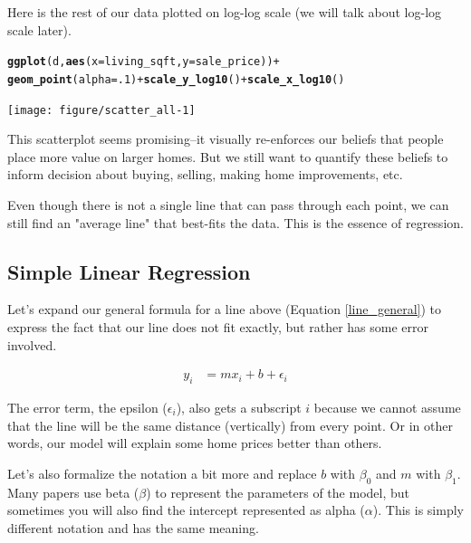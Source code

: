 \documentclass[10pt]{article}\usepackage[]{graphicx}\usepackage[]{color}
\makeatletter
\newcommand{\hlnum}[1]{\textcolor[rgb]{0.686,0.059,0.569}{#1}}%
\newcommand{\hlopt}[1]{\textcolor[rgb]{0,0,0}{#1}}%
\newcommand{\hlstd}[1]{\textcolor[rgb]{0.345,0.345,0.345}{#1}}%
\newcommand{\hlkwc}[1]{\textcolor[rgb]{0.333,0.667,0.333}{#1}}%
\newcommand{\hlkwd}[1]{\textcolor[rgb]{0.737,0.353,0.396}{\textbf{#1}}}%
\newenvironment{kframe}{%
 \def\at@end@of@kframe{}%
 \ifinner\ifhmode%
  \def\at@end@of@kframe{\end{minipage}}%
  \begin{minipage}{\columnwidth}%
 \fi\fi%
 \def\FrameCommand##1{\hskip\@totalleftmargin \hskip-\fboxsep
 \colorbox{shadecolor}{##1}\hskip-\fboxsep
     \hskip-\linewidth \hskip-\@totalleftmargin \hskip\columnwidth}%
 \MakeFramed {\advance\hsize-\width
   \@totalleftmargin\z@ \linewidth\hsize
   \@setminipage}}%
 {\par\unskip\endMakeFramed%
 \at@end@of@kframe}
\newenvironment{knitrout}{}{} %
\makeatother
\begin{document}
Here is the rest of our data plotted on log-log scale (we will talk about log-log scale later).

\begin{knitrout}\small
{}\color{fgcolor}\begin{kframe}
\begin{alltt}
\hlkwd{ggplot}\hlstd{(d,}\hlkwd{aes}\hlstd{(}\hlkwc{x}\hlstd{=living_sqft,}\hlkwc{y}\hlstd{=sale_price))} \hlopt{+}
  \hlkwd{geom_point}\hlstd{(}\hlkwc{alpha}\hlstd{=}\hlnum{.1}\hlstd{)} \hlopt{+} \hlkwd{scale_y_log10}\hlstd{()} \hlopt{+} \hlkwd{scale_x_log10}\hlstd{()}
\end{alltt}
\end{kframe}

{\centering \texttt{[image: figure/scatter\_all-1]} 

}



\end{knitrout}

This scatterplot seems promising--it visually re-enforces our beliefs that people place more value on larger homes. But we still want to quantify these beliefs to inform decision about buying, selling, making home improvements, etc.

Even though there is not a single line that can pass through each point, we can still find an "average line" that best-fits the data. This is the essence of regression.

\subsection*{Simple Linear Regression}

Let's expand our general formula for a line above (Equation \ref{line_general}) to express the fact that our line does not fit exactly, but rather has some error involved. 

\begin{align}
y_i &= mx_i + b + \epsilon_i
\end{align}

The error term, the epsilon ($\epsilon_i$), also gets a subscript $i$ because we cannot assume that the line will be the same distance (vertically) from every point. Or in other words, our model will explain some home prices better than others. 

Let's also formalize the notation a bit more and replace $b$ with $\beta_0$ and $m$ with $\beta_1$. Many papers use beta ($\beta$) to represent the parameters of the model, but sometimes you will also find the intercept represented as alpha ($\alpha$). This is simply different notation and has the same meaning. 
\end{document}
